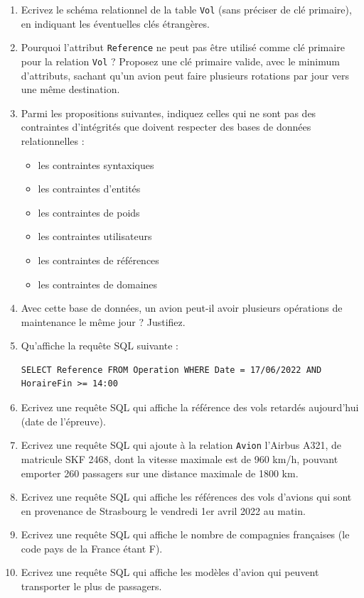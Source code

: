 \documentclass[11pt,a4paper,french,twoside]{PMCours}
\begin{document}
\begin{enumerate}
\item Ecrivez le schéma relationnel de la table \verb'Vol' (sans préciser de clé primaire), en indiquant les éventuelles clés étrangères.
\item Pourquoi l'attribut \verb'Reference' ne peut pas être utilisé comme clé primaire pour la relation \verb'Vol' ? Proposez une clé primaire valide, avec le minimum d'attributs, sachant qu'un avion peut faire plusieurs rotations par jour vers une même destination.
\item Parmi les propositions suivantes, indiquez celles qui ne sont pas des contraintes d'intégrités que doivent respecter des bases de données relationnelles : 
\begin{itemize}
\item les contraintes syntaxiques %
\item les contraintes d'entités
\item les contraintes de poids %
\item les contraintes utilisateurs
\item les contraintes de références
\item les contraintes de domaines
\end{itemize}
\item Avec cette base de données, un avion peut-il avoir plusieurs opérations de maintenance le même jour ? Justifiez.
\item Qu'affiche la requête SQL suivante :
\begin{verbatim}
SELECT Reference FROM Operation WHERE Date = 17/06/2022 AND HoraireFin >= 14:00
\end{verbatim} 
\item Ecrivez une requête SQL qui affiche la référence des vols retardés aujourd'hui (date de l'épreuve).
\item Ecrivez une requête SQL qui ajoute à la relation \verb'Avion' l'Airbus A321, de matricule SKF 2468, dont la vitesse maximale est de 960 km/h, pouvant emporter 260 passagers sur une distance maximale de 1800 km.
\item Ecrivez une requête SQL qui affiche les références des vols d'avions qui sont en provenance de Strasbourg le vendredi 1er avril 2022 au matin.
\item Ecrivez une requête SQL qui affiche le nombre de compagnies françaises (le code pays de la France étant F).
\item Ecrivez une requête SQL qui affiche les modèles d'avion qui peuvent transporter le plus de passagers.

\end{enumerate}
\end{document}

